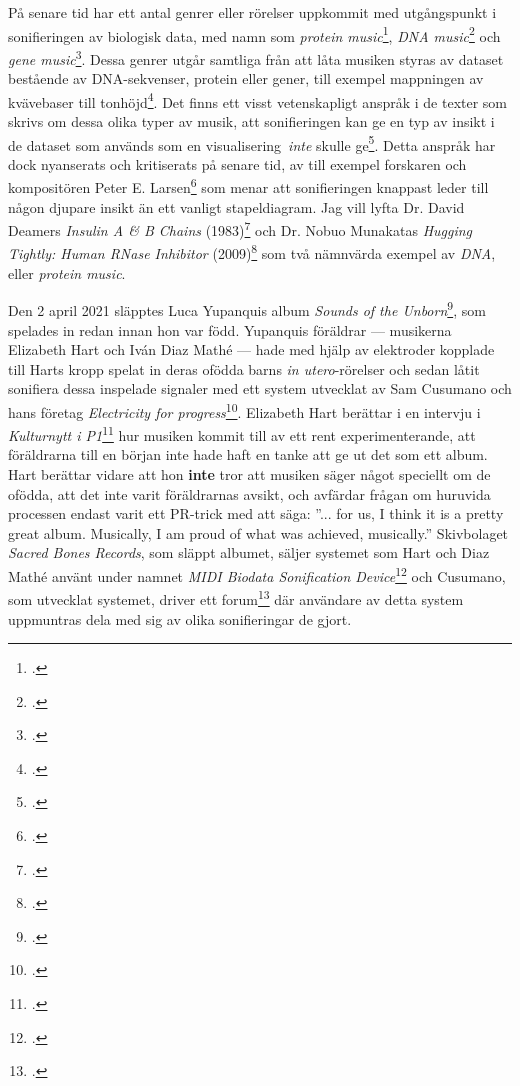 \documentclass[11pt, a4paper]{article} %
\begin{document}
På senare tid har ett antal genrer eller rörelser uppkommit med utgångspunkt i sonifieringen av biologisk data, med namn som \emph{protein music}\footcite{king_pm_1996}, \emph{DNA music}\footcite{k_kawazoe_study_2001} och \emph{gene music}\footcite{munakata_gene_1995}. Dessa genrer utgår samtliga från att låta musiken styras av dataset bestående av DNA-sekvenser, protein eller gener, till exempel mappningen av kvävebaser till tonhöjd\footcite{shi_electronic_2007}. Det finns ett visst vetenskapligt anspråk i de texter som skrivs om dessa olika typer av musik, att sonifieringen kan ge en typ av insikt i de dataset som används som en visualisering \emph{inte} skulle ge\footcite{king_pm_1996}. Detta anspråk har dock nyanserats och kritiserats på senare tid, av till exempel forskaren och kompositören Peter E. Larsen\footcite{larsen_more_2016} som menar att sonifieringen knappast leder till någon djupare insikt än ett vanligt stapeldiagram. Jag vill lyfta Dr. David Deamers \emph{Insulin A \& B Chains} (1983)\footcite{deamer_insulin_1983} och Dr. Nobuo Munakatas \emph{Hugging Tightly: Human RNase Inhibitor} (2009)\footcite{munakata_hugging_2009} som två nämnvärda exempel av \emph{DNA}, eller \emph{protein music}.

Den 2 april 2021 släpptes Luca Yupanquis album \emph{Sounds of the Unborn}\footcite{yupanqui_sounds_2021}, som spelades in redan innan hon var född. Yupanquis föräldrar --- musikerna Elizabeth Hart och Iván Diaz Mathé --- hade med hjälp av elektroder kopplade till Harts kropp spelat in deras ofödda barns \emph{in utero}-rörelser och sedan låtit sonifiera dessa inspelade signaler med ett system utvecklat av Sam Cusumano och hans företag \emph{Electricity for progress}\footcite{noauthor_electricity_nodate}. Elizabeth Hart berättar i en intervju i \emph{Kulturnytt i P1}\footcite{eklund_duo_2021} hur musiken kommit till av ett rent experimenterande, att föräldrarna till en början inte hade haft en tanke att ge ut det som ett album. Hart berättar vidare att hon \textbf{inte} tror att musiken säger något speciellt om de ofödda, att det inte varit föräldrarnas avsikt, och avfärdar frågan om huruvida processen endast varit ett PR-trick med att säga: ''... for us, I think it is a pretty great album. Musically, I am proud of what was achieved, musically.'' Skivbolaget \emph{Sacred Bones Records}, som släppt albumet, säljer systemet som Hart och Diaz Mathé använt under namnet \emph{MIDI Biodata Sonification Device}\footcite{noauthor_midi_nodate} och Cusumano, som utvecklat systemet, driver ett forum\footcite{noauthor_biodata_nodate} där användare av detta system uppmuntras dela med sig av olika sonifieringar de gjort. 
\end{document}
